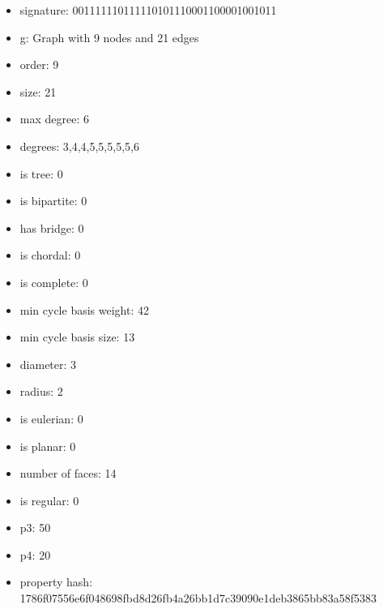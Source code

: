 \newpage
\begin{figure}
\end{figure}
\begin{itemize}
\item signature: 001111110111110101110001100001001011
\item g: Graph with 9 nodes and 21 edges
\item order: 9
\item size: 21
\item max degree: 6
\item degrees: 3,4,4,5,5,5,5,5,6
\item is tree: 0
\item is bipartite: 0
\item has bridge: 0
\item is chordal: 0
\item is complete: 0
\item min cycle basis weight: 42
\item min cycle basis size: 13
\item diameter: 3
\item radius: 2
\item is eulerian: 0
\item is planar: 0
\item number of faces: 14
\item is regular: 0
\item p3: 50
\item p4: 20
\item property hash: 1786f07556e6f048698fbd8d26fb4a26bb1d7c39090e1deb3865bb83a58f5383
\end{itemize}
